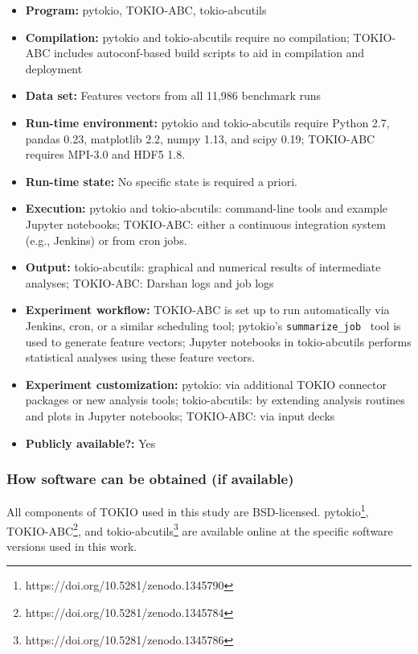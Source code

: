 {\small
\begin{itemize}
  \item {\bf Program: } pytokio, TOKIO-ABC, tokio-abcutils
  \item {\bf Compilation: } pytokio and tokio-abcutils require no compilation; TOKIO-ABC includes autoconf-based build scripts to aid in compilation and deployment
  \item {\bf Data set:} Features vectors from all 11,986 benchmark runs
  \item {\bf Run-time environment: } pytokio and tokio-abcutils require Python 2.7, pandas 0.23, matplotlib 2.2, numpy 1.13, and scipy 0.19; TOKIO-ABC requires MPI-3.0 and HDF5 1.8.
  \item {\bf Run-time state: } No specific state is required a priori.
  \item {\bf Execution: } pytokio and tokio-abcutils: command-line tools and example Jupyter notebooks; TOKIO-ABC: either a continuous integration system (e.g., Jenkins) or from cron jobs.
  \item {\bf Output: } tokio-abcutils: graphical and numerical results of intermediate analyses; TOKIO-ABC: Darshan logs and job logs
  \item {\bf Experiment workflow: } TOKIO-ABC is set up to run automatically via Jenkins, cron, or a similar scheduling tool; pytokio's \texttt{summarize\_job}~\cite{Lockwood2018tokio} tool is used to generate feature vectors; Jupyter notebooks in tokio-abcutils performs statistical analyses using these feature vectors.
  \item {\bf Experiment customization: } pytokio: via additional TOKIO connector packages or new analysis tools; tokio-abcutils: by extending analysis routines and plots in Jupyter notebooks; TOKIO-ABC: via input decks
  \item {\bf Publicly available?: } Yes
\end{itemize}
}

\subsubsection{How software can be obtained (if available)}

All components of TOKIO used in this study are BSD-licensed.
pytokio\footnote{https://doi.org/10.5281/zenodo.1345790}, TOKIO-ABC\footnote{https://doi.org/10.5281/zenodo.1345784}, and tokio-abcutils\footnote{https://doi.org/10.5281/zenodo.1345786} are available online at the specific software versions used in this work.

